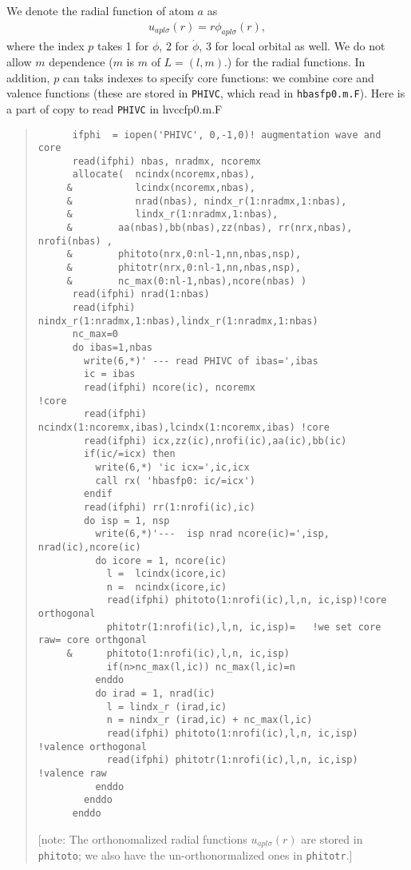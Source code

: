 \documentclass[a4paper,10pt,epsf,fleqn]{article}
\begin{document}
We denote the radial function of atom $a$ as
\begin{eqnarray}
   u_{apl\sigma}(r) = r \phi_{apl\sigma}(r),
\end{eqnarray}
where the index $p$ takes 1 for $\phi$, 2 for $\dot{\phi}$,
3 for local orbital as well. We do not allow $m$ dependence
($m$ is $m$ of $L=(l,m)$.) for the radial functions.
In addition, $p$ can taks indexes to specify core functions:
we combine core and valence functions (these
are stored in \verb|PHIVC|, which read in \verb#hbasfp0.m.F#). 
Here is a part of copy to read \verb#PHIVC# in hvccfp0.m.F
\begin{quote}
{\baselineskip=3mm
\begin{verbatim}
      ifphi  = iopen('PHIVC', 0,-1,0)! augmentation wave and core
      read(ifphi) nbas, nradmx, ncoremx
      allocate(  ncindx(ncoremx,nbas),
     &           lcindx(ncoremx,nbas),
     &           nrad(nbas), nindx_r(1:nradmx,1:nbas),
     &           lindx_r(1:nradmx,1:nbas),
     &        aa(nbas),bb(nbas),zz(nbas), rr(nrx,nbas), nrofi(nbas) ,
     &        phitoto(nrx,0:nl-1,nn,nbas,nsp),
     &        phitotr(nrx,0:nl-1,nn,nbas,nsp),
     &        nc_max(0:nl-1,nbas),ncore(nbas) )
      read(ifphi) nrad(1:nbas)
      read(ifphi) nindx_r(1:nradmx,1:nbas),lindx_r(1:nradmx,1:nbas)
      nc_max=0
      do ibas=1,nbas
        write(6,*)' --- read PHIVC of ibas=',ibas
        ic = ibas
        read(ifphi) ncore(ic), ncoremx                            !core
        read(ifphi) ncindx(1:ncoremx,ibas),lcindx(1:ncoremx,ibas) !core
        read(ifphi) icx,zz(ic),nrofi(ic),aa(ic),bb(ic)
        if(ic/=icx) then
          write(6,*) 'ic icx=',ic,icx
          call rx( 'hbasfp0: ic/=icx')
        endif
        read(ifphi) rr(1:nrofi(ic),ic)
        do isp = 1, nsp
          write(6,*)'---  isp nrad ncore(ic)=',isp, nrad(ic),ncore(ic)
          do icore = 1, ncore(ic)
            l =  lcindx(icore,ic)
            n =  ncindx(icore,ic)
            read(ifphi) phitoto(1:nrofi(ic),l,n, ic,isp)!core orthogonal
            phitotr(1:nrofi(ic),l,n, ic,isp)=   !we set core raw= core orthgonal
     &      phitoto(1:nrofi(ic),l,n, ic,isp)       
            if(n>nc_max(l,ic)) nc_max(l,ic)=n
          enddo
          do irad = 1, nrad(ic)
            l = lindx_r (irad,ic)
            n = nindx_r (irad,ic) + nc_max(l,ic)
            read(ifphi) phitoto(1:nrofi(ic),l,n, ic,isp) !valence orthogonal
            read(ifphi) phitotr(1:nrofi(ic),l,n, ic,isp) !valence raw
          enddo
        enddo
      enddo
\end{verbatim}
}
[note: The orthonomalized radial functions $u_{apl\sigma}(r)$
are stored in \verb#phitoto#; we also have the un-orthonormalized ones in \verb#phitotr#.]
\end{quote}
\end{document}

